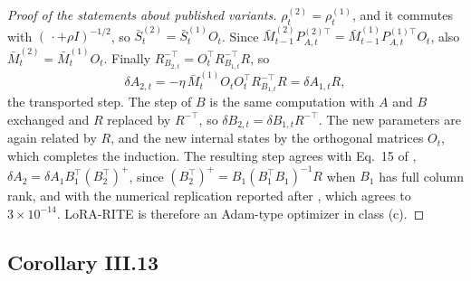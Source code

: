 \begin{proof}[Proof of the statements about published variants]
$\rho^{(2)}_t=\rho^{(1)}_t$, and it commutes with $(\,\cdot+\rho I)^{-1/2}$, so $\bar S^{(2)}_t=\bar S^{(1)}_tO_t$. Since
$\bar M^{(2)}_{t-1}P^{(2)\top}_{A,t}=\bar M^{(1)}_{t-1}P^{(1)\top}_{A,t}O_t$, also $\bar M^{(2)}_t=\bar M^{(1)}_tO_t$.
Finally $R_{B_{2,t}}^{-\top}=O_t^\top R_{B_{1,t}}^{-\top}R$, so
\[\delta A_{2,t}=-\eta\,\bar M^{(1)}_tO_tO_t^\top R_{B_{1,t}}^{-\top}R=\delta A_{1,t}R,\]
the transported step. The step of $B$ is the same computation with $A$ and $B$ exchanged and $R$ replaced by
$R^{-\top}$, so $\delta B_{2,t}=\delta B_{1,t}R^{-\top}$. The new parameters are again related by $R$, and the new
internal states by the orthogonal matrices $O_t$, which completes the induction. The resulting step agrees with Eq.~15
of \citet{yen2024lora}, $\delta A_2=\delta A_1B_1^\top(B_2^\top)^+$, since $(B_2^\top)^+=B_1(B_1^\top B_1)^{-1}R$ when
$B_1$ has full column rank, and with the numerical replication reported after , which agrees
to $3\times10^{-14}$. LoRA-RITE is
therefore an Adam-type optimizer in class (c).
\end{proof}

\subsection{Corollary III.13}\label{proof:III.13}

